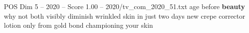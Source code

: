 \begin{textsample}{POS Dim 5 – 2020 – Score 1.00 – 2020/tv\_com\_2020\_51.txt}  \label{ex:f5_pos_039}
age before \textbf{beauty} why not both visibly diminish wrinkled skin in just two days new crepe corrector lotion only from gold bond championing your skin

\end{textsample}
